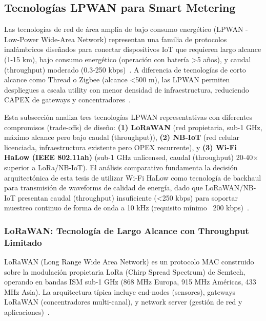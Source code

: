 
\subsection{Tecnologías LPWAN para Smart Metering}
\label{sec:lpwan-technologies}

Las tecnologías de red de área amplia de bajo consumo energético (LPWAN - Low-Power Wide-Area Network) representan una familia de protocolos inalámbricos diseñados para conectar dispositivos IoT que requieren largo alcance (1-15 km), bajo consumo energético (operación con batería >5 años), y caudal (throughput) moderado (0.3-250 kbps)~\cite{chaudhariLPWANTechnologiesEmerging2020,ugwuanyiSurveyIoTDeveloping2021,razaLowPowerWideArea2017}. A diferencia de tecnologías de corto alcance como Thread o Zigbee (alcance <500 m), las LPWAN permiten despliegues a escala utility con menor densidad de infraestructura, reduciendo CAPEX de gateways y concentradores~\cite{zhengPerformancePowerConsumption2018}.

Esta subsección analiza tres tecnologías LPWAN representativas con diferentes compromisos (trade-offs) de diseño: \textbf{(1) LoRaWAN} (red propietaria, sub-1 GHz, máximo alcance pero bajo caudal (throughput)), \textbf{(2) NB-IoT} (red celular licenciada, infraestructura existente pero OPEX recurrente), y \textbf{(3) Wi-Fi HaLow (IEEE 802.11ah)} (sub-1 GHz unlicensed, caudal (throughput) 20-40$\times$ superior a LoRa/NB-IoT). El análisis comparativo fundamenta la decisión arquitectónica de esta tesis de utilizar Wi-Fi HaLow como tecnología de backhaul para transmisión de waveforms de calidad de energía, dado que LoRaWAN/NB-IoT presentan caudal (throughput) insuficiente (<250 kbps) para soportar muestreo continuo de forma de onda a 10 kHz (requisito mínimo ~200 kbps)~\cite{chaudhariLPWANTechnologiesEmerging2020}.

\subsubsection{LoRaWAN: Tecnología de Largo Alcance con Throughput Limitado}

LoRaWAN (Long Range Wide Area Network) es un protocolo MAC construido sobre la modulación propietaria LoRa (Chirp Spread Spectrum) de Semtech, operando en bandas ISM sub-1 GHz (868 MHz Europa, 915 MHz Américas, 433 MHz Asia). La arquitectura típica incluye end-nodes (sensores), gateways LoRaWAN (concentradores multi-canal), y network server (gestión de red y aplicaciones)~\cite{chaudhariLPWANTechnologiesEmerging2020}.


